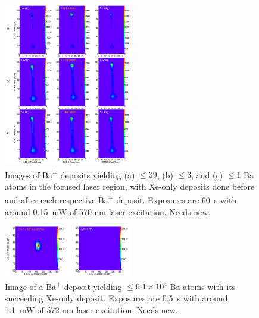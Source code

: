 \documentclass[aps,pra,reprint,superscriptaddress]{revtex4-1}
\begin{document}
\begin{figure}
\includegraphics[width=0.5\textwidth]{figures/xebaxe_instantaneous_scrunched.png}
\caption{Images of Ba\textsuperscript{+} deposits yielding (a) $\leq 39$, (b) $\leq 3$, and (c) $\leq 1$ Ba atoms in the focused laser region, with Xe-only deposits done before and after each respective Ba\textsuperscript{+} deposit.  Exposures are 60~s with around 0.15~mW of 570-nm laser excitation. {\color{gray}Needs new.}}
\label{fig:XeBaXe}
\end{figure}

\begin{figure}
\includegraphics[width=0.5\textwidth]{figures/xebaxe_largest_instantaneous.png}
\caption{Image of a Ba\textsuperscript{+} deposit yielding $\leq 6.1 \times 10^4$ Ba atoms with its succeeding Xe-only deposit.  Exposures are 0.5~s with around 1.1~mW of 572-nm laser excitation. {\color{gray}Needs new.}}
\label{fig:XeBaXeLarge}
\end{figure}
\end{document}
